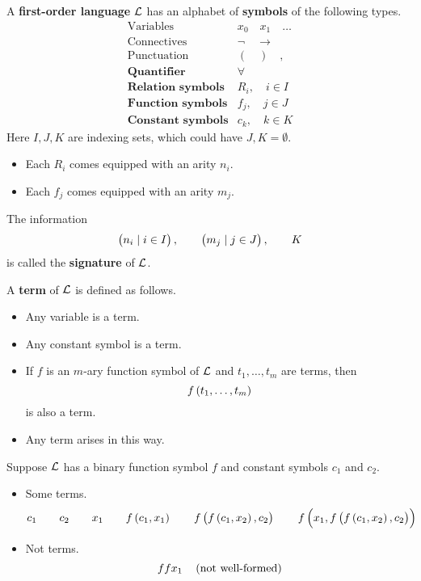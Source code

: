 \begin{definition}
\label{def:2.2.1}
A \textbf{first-order language} $ \mathcal{L} $ has an alphabet of \textbf{symbols} of the following types.
$$
\begin{array}{ll}
\text{Variables} & x_0 \quad x_1 \quad \dots \\
\text{Connectives} & \neg \quad \rightarrow \\
\text{Punctuation} & ( \quad ) \quad , \\
\textbf{Quantifier} & \forall \\
\textbf{Relation symbols} & R_i, \quad i \in I \\
\textbf{Function symbols} & f_j, \quad j \in J \\
\textbf{Constant symbols} & c_k, \quad k \in K
\end{array}
$$
Here $ I, J, K $ are indexing sets, which could have $ J, K = \emptyset $.
\begin{itemize}
\item Each $ R_i $ comes equipped with an arity $ n_i $.
\item Each $ f_j $ comes equipped with an arity $ m_j $.
\end{itemize}
The information
$$ \br{n_i \mid i \in I}, \qquad \br{m_j \mid j \in J}, \qquad K $$
is called the \textbf{signature} of $ \mathcal{L} $.
\end{definition}

\begin{definition}
A \textbf{term} of $ \mathcal{L} $ is defined as follows.
\begin{itemize}
\item Any variable is a term.
\item Any constant symbol is a term.
\item If $ f $ is an $ m $-ary function symbol of $ \mathcal{L} $ and $ t_1, \dots, t_m $ are terms, then
$$ f\br{t_1, \dots, t_m} $$
is also a term.
\item Any term arises in this way.
\end{itemize}
\end{definition}

\pagebreak

\begin{example*}
Suppose $ \mathcal{L} $ has a binary function symbol $ f $ and constant symbols $ c_1 $ and $ c_2 $.
\begin{itemize}
\item Some terms.
$$ c_1 \qquad c_2 \qquad x_1 \qquad f\br{c_1, x_1} \qquad f\br{f\br{c_1, x_2}, c_2} \qquad f\br{x_1, f\br{f\br{c_1, x_2}, c_2}} $$
\item Not terms.
$$ ffx_1 \quad \br{\text{not well-formed}} $$
\end{itemize}
\end{example*}


